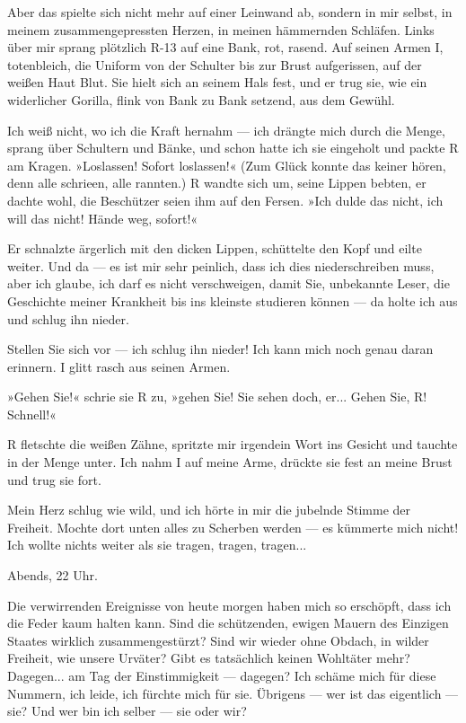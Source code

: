 Aber das spielte sich nicht mehr auf einer Leinwand ab, sondern in
mir selbst, in meinem zusammengepressten Herzen, in meinen
hämmernden Schläfen. Links über mir sprang plötzlich R-13 auf eine
Bank, rot, rasend. Auf seinen Armen I, totenbleich, die Uniform von
der Schulter bis zur Brust aufgerissen, auf der weißen Haut Blut.
Sie hielt sich an seinem Hals fest, und er trug sie, wie ein
widerlicher Gorilla, flink von Bank zu Bank setzend, aus dem
Gewühl.

Ich weiß nicht, wo ich die Kraft hernahm — ich drängte mich durch
die Menge, sprang über Schultern und Bänke, und schon hatte ich sie
eingeholt und packte R am Kragen. »Loslassen! Sofort loslassen!«
(Zum Glück konnte das keiner hören, denn alle schrieen, alle
rannten.) R wandte sich um, seine Lippen bebten, er dachte wohl,
die Beschützer seien ihm auf den Fersen. »Ich dulde das nicht, ich
will das nicht! Hände weg, sofort!«

Er schnalzte ärgerlich mit den dicken Lippen, schüttelte den Kopf
und eilte weiter. Und da — es ist mir sehr peinlich, dass ich dies
niederschreiben muss, aber ich glaube, ich darf es nicht
verschweigen, damit Sie, unbekannte Leser, die Geschichte meiner
Krankheit bis ins kleinste studieren können — da holte ich aus und
schlug ihn nieder.

Stellen Sie sich vor — ich schlug ihn nieder! Ich kann mich noch
genau daran erinnern. I glitt rasch aus seinen Armen.

»Gehen Sie!« schrie sie R zu, »gehen Sie! Sie sehen doch, er...
Gehen Sie, R! Schnell!«

R fletschte die weißen Zähne, spritzte mir irgendein Wort ins
Gesicht und tauchte in der Menge unter. Ich nahm I auf meine Arme,
drückte sie fest an meine Brust und trug sie fort.

Mein Herz schlug wie wild, und ich hörte in mir die jubelnde Stimme
der Freiheit. Mochte dort unten alles zu Scherben werden — es
kümmerte mich nicht! Ich wollte nichts weiter als sie tragen,
tragen, tragen...

Abends, 22 Uhr.

Die verwirrenden Ereignisse von heute morgen haben mich so
erschöpft, dass ich die Feder kaum halten kann. Sind die
schützenden, ewigen Mauern des Einzigen Staates wirklich
zusammengestürzt? Sind wir wieder ohne Obdach, in wilder Freiheit,
wie unsere Urväter? Gibt es tatsächlich keinen Wohltäter mehr?
Dagegen... am Tag der Einstimmigkeit — dagegen? Ich schäme mich für
diese Nummern, ich leide, ich fürchte mich für sie. Übrigens — wer
ist das eigentlich — sie? Und wer bin ich selber — sie oder wir?

